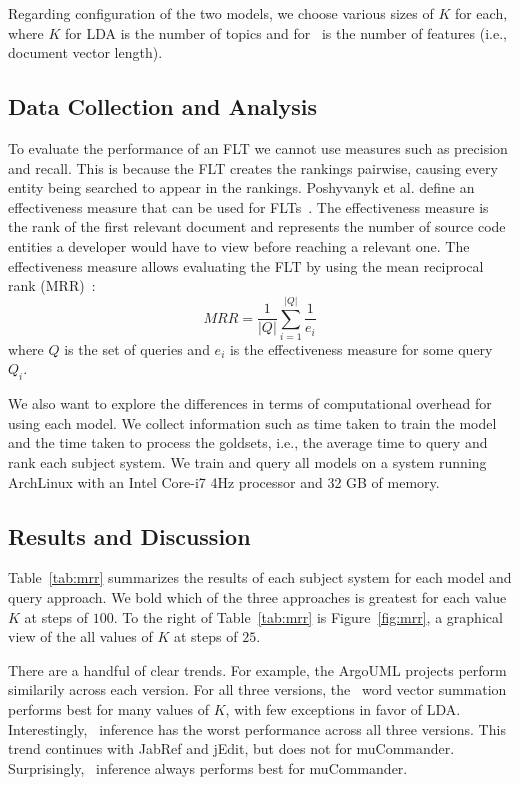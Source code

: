 Regarding configuration of the two models, we choose various sizes of $K$ for
each, where $K$ for LDA is the number of topics and for \dv\ is the number of
features (i.e., document vector length).


\subsection{Data Collection and Analysis}

To evaluate the performance of an FLT we cannot use measures such as precision
and recall. This is because the FLT creates the rankings pairwise, causing every
entity being searched to appear in the rankings.  Poshyvanyk et al. define an
effectiveness measure that can be used for FLTs~\cite{Poshyvanyk-etal_2007}.
The effectiveness measure is the rank of the first relevant document and
represents the number of source code entities a developer would have to view
before reaching a relevant one.  The effectiveness measure allows evaluating the
FLT by using the mean reciprocal rank (MRR)~\cite{Voorhees_1999}: %
\begin{equation}
    MRR = \frac{1}{|Q|} \sum_{i=1}^{|Q|} \frac{1}{e_i}
\end{equation}
where $Q$ is the set of queries and $e_i$ is the effectiveness measure for some
query $Q_i$.

We also want to explore the differences in terms of computational overhead for
using each model.  We collect information such as time taken to train the model
and the time taken to process the goldsets, i.e., the average time to query and
rank each subject system. We train and query all models on a system running
ArchLinux with an Intel Core-i7 4Hz processor and 32 GB of memory.

\subsection{Results and Discussion}





Table~\ref{tab:mrr} summarizes the results of each subject system for each model
and query approach. We bold which of the three approaches is greatest for each
value $K$ at steps of $100$. To the right of Table~\ref{tab:mrr} is
Figure~\ref{fig:mrr}, a graphical view of the all values of $K$ at steps of
$25$.

There are a handful of clear trends. For example, the ArgoUML projects perform
similarily across each version. For all three versions, the \dv\ word vector
summation performs best for many values of $K$, with few exceptions in favor of
LDA.  Interestingly, \dv\ inference has the worst performance across all three
versions. This trend continues with JabRef and jEdit, but does not for
muCommander.  Surprisingly, \dv\ inference always performs best for muCommander.

